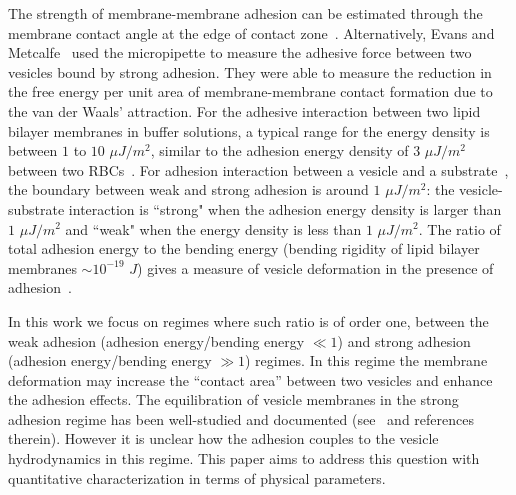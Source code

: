 \documentclass[prf,superscriptaddress,showkeys]{revtex4-1}
\begin{document}
The strength of membrane-membrane adhesion can be estimated through the
membrane contact angle at the edge of contact
zone~\cite{RamachandranAndersonLealIsraelachvili2010_Langmuir,
MaresDanielIglic2012_SciWorldJ}.  Alternatively, Evans and
Metcalfe~\cite{EvansMetcalfe1984_BJ} used the micropipette to measure
the adhesive force between two vesicles bound by strong adhesion.  They
were able to measure the reduction in the free energy per unit area of
membrane-membrane contact formation due to the van der Waals'
attraction. For the adhesive interaction between two lipid bilayer
membranes in buffer solutions, a typical range for the energy density is
between $1$ to $10$ $\mu J/m^2$, similar to the adhesion energy density
of $3$ $\mu J/m^2$ between two
RBCs~\cite{FlormannAouane2017_SciReports}.  For adhesion interaction
between a vesicle and a substrate~\cite{GruhnFrankeDimova2007_Langmuir},
the boundary between weak and strong adhesion is around $1$ $\mu J/m^2$:
the vesicle-substrate interaction is ``strong" when the adhesion energy
density is larger than $1$ $\mu J/m^2$ and ``weak" when the energy
density is less than $1$ $\mu J/m^2$.  
The ratio of total adhesion energy to the bending energy
(bending rigidity of lipid bilayer membranes $\sim 10^{-19}$ $J$) gives
a measure of vesicle deformation in the presence of
adhesion~\cite{RamachandranAndersonLealIsraelachvili2010_Langmuir}. 

In this work we focus on regimes where such ratio is of order one,
between the weak adhesion (adhesion energy/bending energy $\ll 1$) and
strong adhesion (adhesion energy/bending energy $\gg 1$) regimes.  In
this regime the membrane deformation may increase the ``contact area''
between two vesicles and enhance the adhesion effects.  The
equilibration of vesicle membranes in the strong adhesion regime has
been well-studied and documented
(see~\cite{RamachandranAndersonLealIsraelachvili2010_Langmuir,
SteinkuhlerAgudo-Canalejo2016_BJ, FlormannAouane2017_SciReports} and
references therein). However it is unclear how the adhesion couples to
the vesicle hydrodynamics in this regime.  This paper aims to address
this question with quantitative characterization in terms of physical
parameters.

%
% 
% 
\end{document}
